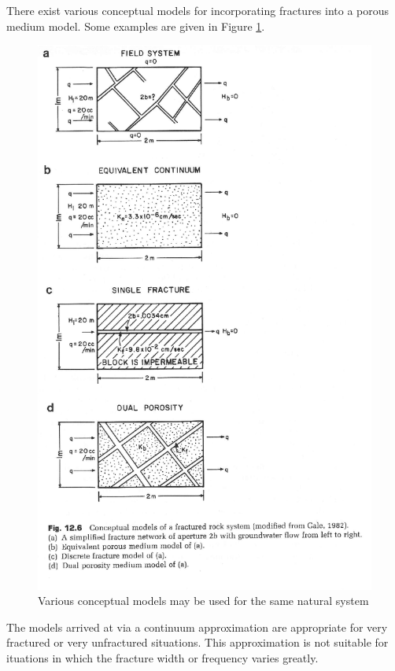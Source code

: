 There exist various conceptual models for incorporating fractures into a porous  
medium model. Some examples are given in Figure \ref{fig:fractureModels}.

\begin{figure}[htbp!]
  \begin{center}
    \includegraphics{./litrev/fractureModels.eps}
  \end{center}
  \caption{Various conceptual models may be used for the same natural system 
  \cite{anderson_applied_1992}}
  \label{fig:fractureModels}
\end{figure}


The models arrived at via a continuum approximation are appropriate
for very fractured or very unfractured situations. This approximation is not 
suitable for ituations in which the fracture width or frequency varies greatly.

